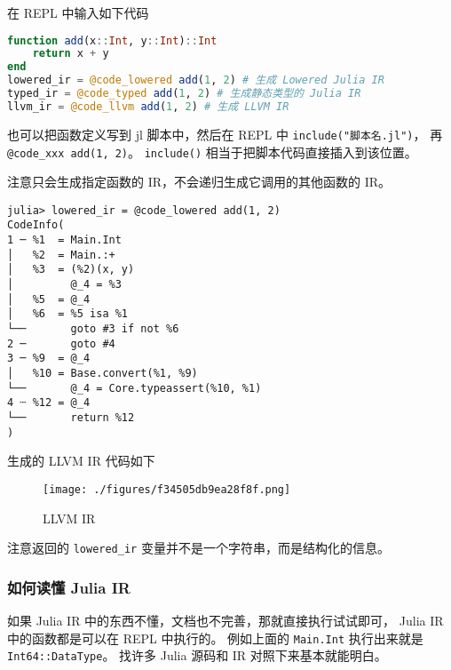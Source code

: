 在 REPL 中输入如下代码
\begin{lstlisting}[language=julia,caption=julia]
function add(x::Int, y::Int)::Int
    return x + y
end
lowered_ir = @code_lowered add(1, 2) # 生成 Lowered Julia IR
typed_ir = @code_typed add(1, 2) # 生成静态类型的 Julia IR
llvm_ir = @code_llvm add(1, 2) # 生成 LLVM IR
\end{lstlisting}

也可以把函数定义写到 jl 脚本中，然后在 REPL 中 \verb`include("脚本名.jl")`， 再 \verb`@code_xxx add(1, 2)`。 \verb`include()` 相当于把脚本代码直接插入到该位置。

注意只会生成指定函数的 IR，不会递归生成它调用的其他函数的 IR。

\begin{lstlisting}[language=none,caption=julia ir]
julia> lowered_ir = @code_lowered add(1, 2)
CodeInfo(
1 ─ %1  = Main.Int
│   %2  = Main.:+
│   %3  = (%2)(x, y)   
│         @_4 = %3
│   %5  = @_4
│   %6  = %5 isa %1
└──       goto #3 if not %6
2 ─       goto #4
3 ─ %9  = @_4
│   %10 = Base.convert(%1, %9)
└──       @_4 = Core.typeassert(%10, %1)
4 ┄ %12 = @_4
└──       return %12
)
\end{lstlisting}

生成的 LLVM IR 代码如下
\begin{figure}[ht]
\centering
\texttt{[image: ./figures/f34505db9ea28f8f.png]}
\caption{LLVM IR} \label{fig_julia0_2}
\end{figure}

注意返回的 \verb`lowered_ir` 变量并不是一个字符串，而是结构化的信息。

\subsubsection{如何读懂 Julia IR}
如果 Julia IR 中的东西不懂，文档也不完善，那就直接执行试试即可， Julia IR 中的函数都是可以在 REPL 中执行的。 例如上面的 \verb`Main.Int` 执行出来就是 \verb`Int64::DataType`。 找许多 Julia 源码和 IR 对照下来基本就能明白。

